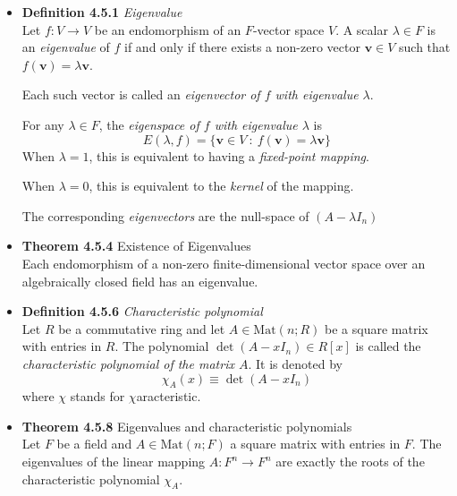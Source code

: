 \documentclass[11pt,a4paper]{article}
\begin{document}
\begin{itemize}
    \item \textbf{Definition 4.5.1} \emph{Eigenvalue} \\
        Let $f : V \to V$ be an endomorphism of an $F$-vector space $V$.
        A scalar $\lambda \in F$ is an \emph{eigenvalue} of $f$ if and only if there exists
        a non-zero vector $\textbf{v} \in V$ such that $f(\textbf{v}) = \lambda \textbf{v}$.

        Each such vector is called an \emph{eigenvector of $f$ with eigenvalue $\lambda$}.

        For any $\lambda \in F$, the \emph{eigenspace of $f$ with eigenvalue $\lambda$} is
        \[
            E(\lambda, f) = \{ \textbf{v} \in V \ : \ f(\textbf{v}) = \lambda \textbf{v} \}
        \]
        When $\lambda = 1$, this is equivalent to having a \emph{fixed-point mapping}.

        When $\lambda = 0$, this is equivalent to the \emph{kernel} of the mapping.

        The corresponding \emph{eigenvectors} are the null-space of $(A - \lambda I_n)$

    \item \textbf{Theorem 4.5.4} Existence of Eigenvalues \\
        Each endomorphism of a non-zero finite-dimensional vector space over an algebraically
        closed field has an eigenvalue.

    \item \textbf{Definition 4.5.6} \emph{Characteristic polynomial} \\
        Let $R$ be a commutative ring and let $A \in \mathrm{Mat}(n; R)$ be a square matrix with
        entries in $R$.
        The polynomial $\det (A - x I_n) \in R[x]$ is called the
        \emph{characteristic polynomial of the matrix $A$}.
        It is denoted by
        \[
            \chi_A (x) \equiv \det(A - x I_n)
        \]
        where $\chi$ stands for $\chi$aracteristic.

    \item \textbf{Theorem 4.5.8} Eigenvalues and characteristic polynomials \\
        Let $F$ be a field and $A \in \mathrm{Mat}(n; F)$ a square matrix with entries in $F$.
        The eigenvalues of the linear mapping $A : F^n \to F^n$ are exactly the roots of the
        characteristic polynomial $\chi_A$.

\end{itemize}
\end{document}
